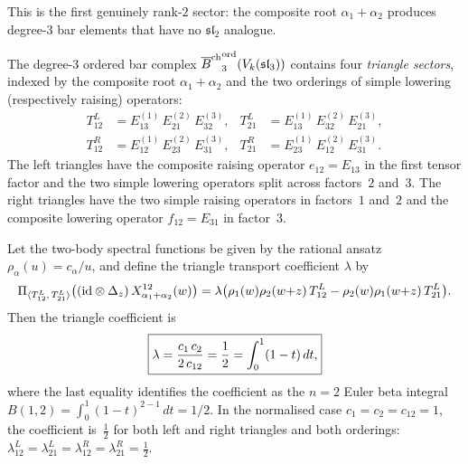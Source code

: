 This is the first genuinely rank-$2$ sector: the composite root
$\alpha_1+\alpha_2$ produces degree-$3$ bar elements that
have no $\mathfrak{sl}_2$ analogue.

\begin{definition}
\label{def:sl3-triangle-sectors}
The degree-$3$ ordered bar complex
${\overline{B}^{\mathrm{ch}}}^{\mathrm{ord}}_3(V_k(\mathfrak{sl}_3))$
contains four \emph{triangle sectors}, indexed by the composite
root $\alpha_1+\alpha_2$ and the two orderings of simple lowering
(respectively raising) operators:
\begin{align*}
T^L_{12}&=E_{13}^{(1)}\,E_{21}^{(2)}\,E_{32}^{(3)},
&
T^L_{21}&=E_{13}^{(1)}\,E_{32}^{(2)}\,E_{21}^{(3)},\\
T^R_{12}&=E_{12}^{(1)}\,E_{23}^{(2)}\,E_{31}^{(3)},
&
T^R_{21}&=E_{23}^{(1)}\,E_{12}^{(2)}\,E_{31}^{(3)}.
\end{align*}
The left triangles have the composite raising operator $e_{12}=E_{13}$ in
the first tensor factor and the two simple lowering operators split
across factors~$2$ and~$3$. The right triangles have the two simple
raising operators in factors~$1$ and~$2$ and the composite lowering
operator $f_{12}=E_{31}$ in factor~$3$.
\end{definition}

\begin{theorem}
\label{thm:sl3-triangle-coefficient}
Let the two-body spectral functions be given by the rational ansatz
$\rho_{\alpha}(u)=c_\alpha/u$, and define the triangle transport
coefficient $\lambda$ by
\[
\Pi_{\langle T^L_{12},\,T^L_{21}\rangle}
\big((\mathrm{id}\otimes\Delta_z)\,X_{\alpha_1+\alpha_2}^{12}(w)\big)
=
\lambda\big(\rho_1(w)\rho_2(w{+}z)\,T^L_{12}
-\rho_2(w)\rho_1(w{+}z)\,T^L_{21}\big).
\]
Then the triangle coefficient is
\[
\boxed{%
\lambda
=
\frac{c_1\,c_2}{2\,c_{12}}
=
\frac{1}{2}
=
\int_0^1(1-t)\,dt,
}
\]
where the last equality identifies the coefficient as the $n=2$ Euler
beta integral $B(1,2)=\int_0^1(1-t)^{2-1}\,dt=1/2$.
In the normalised case $c_1=c_2=c_{12}=1$, the coefficient is~$\frac12$
for both left and right triangles and both orderings:
$\lambda^L_{12}=\lambda^L_{21}=\lambda^R_{12}=\lambda^R_{21}=\frac12$.
\end{theorem}

